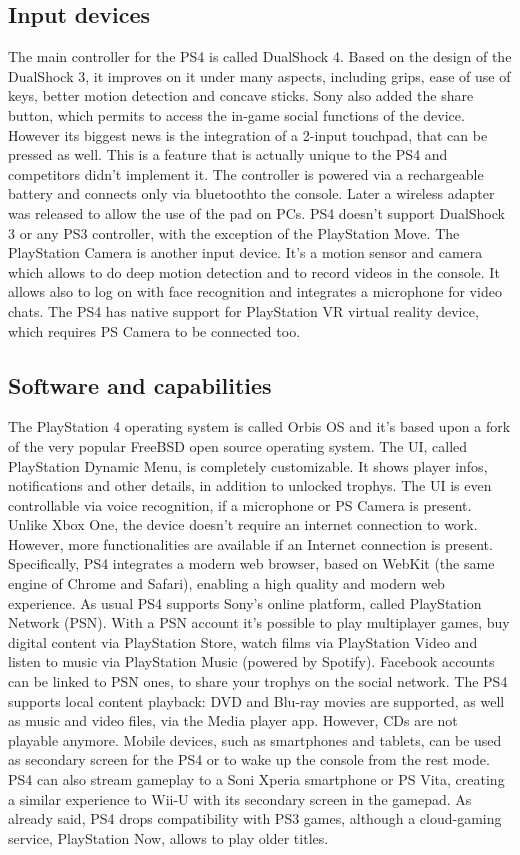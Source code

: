\documentclass[a4paper,10pt]{book}
\begin{document}
 \subsection{ Input devices  }
  The main controller for the PS4 is called DualShock 4. Based on the design of the DualShock 3, it improves on it under many aspects, including grips, ease of use of keys, better motion detection and concave sticks. Sony also added the share button, which permits to access the in-game social functions of the device.  
  However its biggest news is the integration of a 2-input touchpad, that can be pressed as well. This is a feature that is actually unique to the PS4 and competitors didn't implement it.  
  The controller is powered via a rechargeable battery and connects only via bluetoothto the console. Later a wireless adapter was released to allow the use of the pad on PCs. PS4 doesn't support DualShock 3 or any PS3 controller, with the exception of the PlayStation Move.  
  The PlayStation Camera is another input device. It's a motion sensor and camera which allows to do deep motion detection and to record videos in the console. It allows also to log on with face recognition and integrates a microphone for video chats.  
  The PS4 has native support for PlayStation VR virtual reality device, which requires PS Camera to be connected too.  
 \subsection{ Software and capabilities }
  The PlayStation 4 operating system is called Orbis OS and it's based upon a fork of the very popular FreeBSD open source operating system. The UI, called PlayStation Dynamic Menu, is completely customizable. It shows player infos, notifications and other details, in addition to unlocked trophys. The UI is even controllable via voice recognition, if a microphone or PS Camera is present. 
  Unlike Xbox One, the device doesn't require an internet connection to work. However, more functionalities are available if an Internet connection is present. Specifically, PS4 integrates a modern web browser, based on WebKit (the same engine of Chrome and Safari), enabling a high quality and modern web experience.  
  As usual PS4 supports Sony's online platform, called PlayStation Network (PSN). With a PSN account it's possible to play multiplayer games, buy digital content via PlayStation Store, watch films via PlayStation Video and listen to music via PlayStation Music (powered by Spotify). Facebook accounts can be linked to PSN ones, to share your trophys on the social network. 
  The PS4 supports local content playback: DVD and Blu-ray movies are supported, as well as music and video files, via the Media player app. However, CDs are not playable anymore.  
  Mobile devices, such as smartphones and tablets, can be used as secondary screen for the PS4 or to wake up the console from the rest mode. PS4 can also stream gameplay to a Soni Xperia smartphone or PS Vita, creating a similar experience to Wii-U with its secondary screen in the gamepad.  
  As already said, PS4 drops compatibility with PS3 games, although a cloud-gaming service, PlayStation Now, allows to play older titles.  
\end{document}
